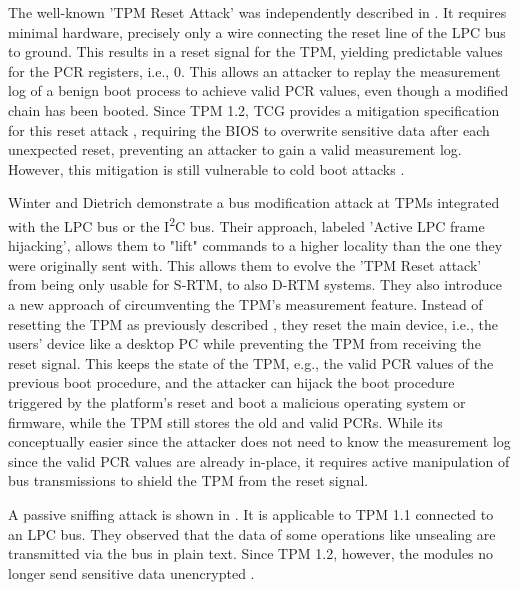 The well-known 'TPM Reset Attack' was independently described in \cite{kauerBernhard,sparks2007}. It requires minimal hardware, precisely only a wire connecting the reset line of the LPC bus \cite{lpc} to ground. This results in a reset signal for the TPM, yielding predictable values for the PCR registers, i.e., 0. This allows an attacker to replay the measurement log of a benign boot process to achieve valid PCR values, even though a modified chain has been booted.
Since TPM 1.2, TCG provides a mitigation specification for this reset attack \cite{tcgResetFix}, requiring the BIOS to overwrite sensitive data after each unexpected reset, preventing an attacker to gain a valid measurement log.
However, this mitigation is still vulnerable to cold boot attacks \cite{Halderman2009, Winter2013}.

Winter and Dietrich \cite{Winter2013} demonstrate a bus modification attack at TPMs integrated with the LPC bus or the I\textsuperscript{2}C bus.
Their approach, labeled 'Active LPC frame hijacking', allows them to "lift" commands to a higher locality than the one they were originally sent with. This allows them to evolve the 'TPM Reset attack' from being only usable for S-RTM, to also D-RTM systems.
They also introduce a new approach of circumventing the TPM's measurement feature. Instead of resetting the TPM as previously described \cite{kauerBernhard,sparks2007}, they reset the main device, i.e., the users' device like a desktop PC while preventing the TPM from receiving the reset signal. This keeps the state of the TPM, e.g., the valid PCR values of the previous boot procedure, and the attacker can hijack the boot procedure triggered by the platform's reset and boot a malicious operating system or firmware, while the TPM still stores the old and valid PCRs. While its conceptually easier since the attacker does not need to know the measurement log since the valid PCR values are already in-place, it requires active manipulation of bus transmissions to shield the TPM from the reset signal.

A passive sniffing attack is shown in \cite{Kursawe2005AnalyzingTP}. It is applicable to TPM 1.1 connected to an LPC bus. They observed that the data of some operations like unsealing are transmitted via the bus in plain text. Since TPM 1.2, however, the modules no longer send sensitive data unencrypted \cite{Winter2013}.

